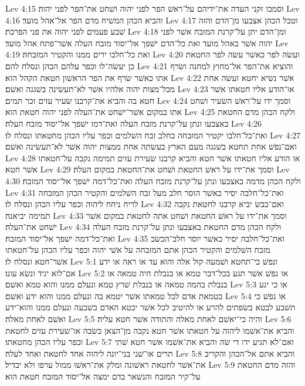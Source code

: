 Lev 4:15  וסמכו זקני העדה את־ידיהם על־ראשׁ הפר לפני יהוה ושׁחט את־הפר לפני יהוה׃
Lev 4:16  והביא הכהן המשׁיח מדם הפר אל־אהל מועד׃
Lev 4:17  וטבל הכהן אצבעו מן־הדם והזה שׁבע פעמים לפני יהוה את פני הפרכת׃
Lev 4:18  ומן־הדם יתן על־קרנת המזבח אשׁר לפני יהוה אשׁר באהל מועד ואת כל־הדם ישׁפך אל־יסוד מזבח העלה אשׁר־פתח אהל מועד׃
Lev 4:19  ואת כל־חלבו ירים ממנו והקטיר המזבחה׃
Lev 4:20  ועשׂה לפר כאשׁר עשׂה לפר החטאת כן יעשׂה־לו וכפר עלהם הכהן ונסלח להם׃
Lev 4:21  והוציא את־הפר אל־מחוץ למחנה ושׂרף אתו כאשׁר שׂרף את הפר הראשׁון חטאת הקהל הוא׃
Lev 4:22  אשׁר נשׂיא יחטא ועשׂה אחת מכל־מצות יהוה אלהיו אשׁר לא־תעשׂינה בשׁגגה ואשׁם׃
Lev 4:23  או־הודע אליו חטאתו אשׁר חטא בה והביא את־קרבנו שׂעיר עזים זכר תמים׃
Lev 4:24  וסמך ידו על־ראשׁ השׂעיר ושׁחט אתו במקום אשׁר־ישׁחט את־העלה לפני יהוה חטאת הוא׃
Lev 4:25  ולקח הכהן מדם החטאת באצבעו ונתן על־קרנת מזבח העלה ואת־דמו ישׁפך אל־יסוד מזבח העלה׃
Lev 4:26  ואת־כל־חלבו יקטיר המזבחה כחלב זבח השׁלמים וכפר עליו הכהן מחטאתו ונסלח לו׃
Lev 4:27  ואם־נפשׁ אחת תחטא בשׁגגה מעם הארץ בעשׂתה אחת ממצות יהוה אשׁר לא־תעשׂינה ואשׁם׃
Lev 4:28  או הודע אליו חטאתו אשׁר חטא והביא קרבנו שׂעירת עזים תמימה נקבה על־חטאתו אשׁר חטא׃
Lev 4:29  וסמך את־ידו על ראשׁ החטאת ושׁחט את־החטאת במקום העלה׃
Lev 4:30  ולקח הכהן מדמה באצבעו ונתן על־קרנת מזבח העלה ואת־כל־דמה ישׁפך אל־יסוד המזבח׃
Lev 4:31  ואת־כל־חלבה יסיר כאשׁר הוסר חלב מעל זבח השׁלמים והקטיר הכהן המזבחה לריח ניחח ליהוה וכפר עליו הכהן ונסלח לו׃
Lev 4:32  ואם־כבשׂ יביא קרבנו לחטאת נקבה תמימה יביאנה׃
Lev 4:33  וסמך את־ידו על ראשׁ החטאת ושׁחט אתה לחטאת במקום אשׁר ישׁחט את־העלה׃
Lev 4:34  ולקח הכהן מדם החטאת באצבעו ונתן על־קרנת מזבח העלה ואת־כל־דמה ישׁפך אל־יסוד המזבח׃
Lev 4:35  ואת־כל־חלבה יסיר כאשׁר יוסר חלב־הכשׂב מזבח השׁלמים והקטיר הכהן אתם המזבחה על אשׁי יהוה וכפר עליו הכהן על־חטאתו אשׁר־חטא ונסלח לו׃
Lev 5:1  ונפשׁ כי־תחטא ושׁמעה קול אלה והוא עד או ראה או ידע אם־לוא יגיד ונשׂא עונו׃
Lev 5:2  או נפשׁ אשׁר תגע בכל־דבר טמא או בנבלת חיה טמאה או בנבלת בהמה טמאה או בנבלת שׁרץ טמא ונעלם ממנו והוא טמא ואשׁם׃
Lev 5:3  או כי יגע בטמאת אדם לכל טמאתו אשׁר יטמא בה ונעלם ממנו והוא ידע ואשׁם׃
Lev 5:4  או נפשׁ כי תשׁבע לבטא בשׂפתים להרע או להיטיב לכל אשׁר יבטא האדם בשׁבעה ונעלם ממנו והוא־ידע ואשׁם לאחת מאלה׃
Lev 5:5  והיה כי־יאשׁם לאחת מאלה והתודה אשׁר חטא עליה׃
Lev 5:6  והביא את־אשׁמו ליהוה על חטאתו אשׁר חטא נקבה מן־הצאן כשׂבה או־שׂעירת עזים לחטאת וכפר עליו הכהן מחטאתו׃
Lev 5:7  ואם־לא תגיע ידו די שׂה והביא את־אשׁמו אשׁר חטא שׁתי תרים או־שׁני בני־יונה ליהוה אחד לחטאת ואחד לעלה׃
Lev 5:8  והביא אתם אל־הכהן והקריב את־אשׁר לחטאת ראשׁונה ומלק את־ראשׁו ממול ערפו ולא יבדיל׃
Lev 5:9  והזה מדם החטאת על־קיר המזבח והנשׁאר בדם ימצה אל־יסוד המזבח חטאת הוא׃
